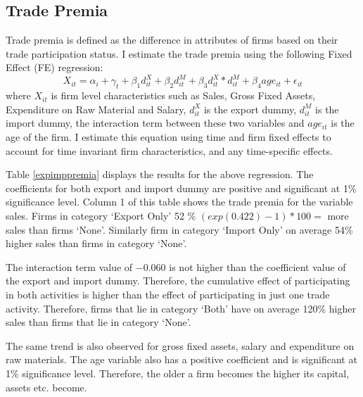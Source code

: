 \documentclass[12pt]{article}
\begin{document}
\subsection{Trade Premia}
Trade premia is defined as the difference in
attributes of firms based on their trade participation status. I
estimate the trade premia using the following Fixed Effect (FE) regression:
\begin{equation}
\label{FE}
 X_{it} = \alpha_i + \gamma_{t} + \beta_{1} d_{it}^{X}+ \beta_{2} d_{it}^{M}+
\beta_{3} d_{it}^{X}*d_{it}^{M} + \beta_{4} age_{it} + \epsilon_{it}
\end{equation}
where $X_{it}$ is firm level characteristics such as Sales, Gross
Fixed Assets, Expenditure on Raw Material and Salary, $d_{it}^X$ is
the export dummy, $d_{it}^M$ is
the import  dummy, the interaction term between these two variables
and $age_{it}$ is the age of the firm. I estimate this equation using
time and firm fixed
effects to account for time invariant firm characteristics, and any
time-specific effects.


\begin{center}

\end{center}

Table \ref{expimppremia} displays the results for the above
regression. The coefficients for both export and import dummy are positive
and significant at 1\% significance level. Column 1 of this table
shows the trade premia for the variable sales. Firms
in category `Export Only'   52 \% $(exp(0.422) -1)* 100 = $ more
sales than firms `None'. Similarly firm in category `Import Only'
on average 54\% higher sales than firms in category `None'. 

 The interaction term value of $-0.060$ is not higher than the coefficient
value of the export and import dummy. Therefore, the cumulative
effect of participating in both activities is higher than the effect
of participating in just one trade activity. Therefore, firms that lie
in category `Both' have  on average 120\% higher sales than firms that
lie in category `None'. 

 The same trend
is also observed for  gross fixed assets, salary and expenditure on
raw materials.  The age variable also
has a positive coefficient and is significant at 1\% significance
level. Therefore, the older a firm becomes the higher its capital,
assets etc. become. 
\end{document}
